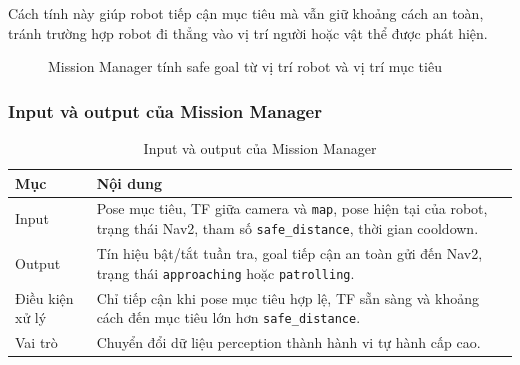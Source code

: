Cách tính này giúp robot tiếp cận mục tiêu mà vẫn giữ khoảng cách an toàn, tránh trường hợp robot đi thẳng vào vị trí người hoặc vật thể được phát hiện.

\begin{figure}[H]
\centering
{}
\caption{Mission Manager tính safe goal từ vị trí robot và vị trí mục tiêu}
\label{fig:mission-manager-safe-goal}
\end{figure}

\subsubsection{Input và output của Mission Manager}
\label{subsubsec:mission-manager-io}

\begin{table}[H]
    \centering
    \caption{Input và output của Mission Manager}
    \label{tab:mission-manager-io}
    \renewcommand{\arraystretch}{1.25}
    \small
    \begin{tabularx}{\textwidth}{|>{\raggedright\arraybackslash}p{}|>{\raggedright\arraybackslash}X|}
        \hline
        \textbf{Mục} & \textbf{Nội dung} \\
        \hline
        Input & Pose mục tiêu, TF giữa camera và \texttt{map}, pose hiện tại của robot, trạng thái Nav2, tham số \texttt{safe\_distance}, thời gian cooldown. \\
        \hline
        Output & Tín hiệu bật/tắt tuần tra, goal tiếp cận an toàn gửi đến Nav2, trạng thái \texttt{approaching} hoặc \texttt{patrolling}. \\
        \hline
        Điều kiện xử lý & Chỉ tiếp cận khi pose mục tiêu hợp lệ, TF sẵn sàng và khoảng cách đến mục tiêu lớn hơn \texttt{safe\_distance}. \\
        \hline
        Vai trò & Chuyển đổi dữ liệu perception thành hành vi tự hành cấp cao. \\
        \hline
    \end{tabularx}
\end{table}

